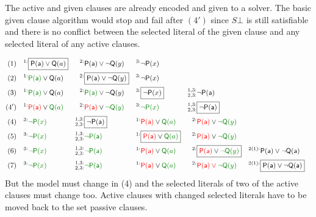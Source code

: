 \begin{example}[InstGen]The active and given clauses are already encoded and given to a \SAT solver.
	The basic given clause algorithm would stop and fail after $(4')$
	since $S\bot$ is still satisfiable and there is no conflict between the selected literal of the given clause 
	and any selected literal of any active clauses.
	
	
	\begin{align*}
	(1)\quad^{1:}&\boxed{\mP(\ma)\lor\mQ(a)} & ^{2:}&\mP(\ma)\lor\lnot\mQ(y) & ^{3:}&\lnot\mP(x)
	\\
	(2)\quad^{1:}&{\colHi\mP(\ma)}\lor\mQ(a) & ^{2:}&\boxed{\mP(\ma)\lor\lnot\mQ(y)} & ^{3:}&\lnot\mP(x) 
	\\
	(3)\quad^{1:}&{\colHi\mP(\ma)}\lor\mQ(a) & ^{2:}&{\colHi\mP(\ma)}\lor\lnot\mQ(y) & ^{3:}&\boxed{\lnot\mP(x)} 
	& ^{1,3:}_{2,3:}&\lnot\mP(\ma)
	\\
	(4')\quad
	^{1:}&{\colLo\mP(\ma)}\lor\colHi\mQ(a) & ^{2:}&{\colLo\mP(\ma)}\lor\colHi\lnot\mQ(y) & ^{3:}&{\colHi\lnot\mP(x)} 
	& ^{1,3:}_{2,3:}&\boxed{\lnot\mP(\ma)}
	\\
	(4)\quad^{3:}&{\colHi\lnot\mP(x)} 
	& ^{1,3:}_{2,3:}&\boxed{\lnot\mP(\ma)}
	& ^{1:}&{\colLo\mP(\ma)}\lor\colHi\mQ(a) & ^{2:}&{\colLo\mP(\ma)}\lor\colHi\lnot\mQ(y)
	\\
	(5)\quad^{3:}&{\colHi\lnot\mP(x)} 
	& ^{1,3:}_{2,3:}&\colHi\lnot\mP(\ma)
	& ^{1:}&\boxed{{\colLo\mP(\ma)}\lor\colHi\mQ(a)} & ^{2:}&{\colLo\mP(\ma)}\lor\colHi\lnot\mQ(y)
	\\
	(6)\quad^{3:}&{\colHi\lnot\mP(x)} 
	& ^{1,3:}_{2,3:}&\colHi\lnot\mP(\ma)
	& ^{1:}&{\colLo\mP(\ma)}\lor\colHi\mQ(a) & ^{2:}&\boxed{{\colLo\mP(\ma)}\lor\colHi\lnot\mQ(y)}
	& ^{2(1):}&\mP(\ma)\lor\lnot\mQ(\ma)
	\\
	(7)\quad^{3:}&{\colHi\lnot\mP(x)} 
	& ^{1,3:}_{2,3:}&\colHi\lnot\mP(\ma)
	& ^{1:}&{\colLo\mP(\ma)}\lor\colHi\mQ(a) & ^{2:}&{\colLo\mP(\ma)\lor\colHi\lnot\mQ(y)}
	& ^{2(1):}&\boxed{\mP(\ma)\lor\lnot\mQ(\ma)}
	\end{align*}
	But the model must change in (4) and the selected literals of two of the active clauses must change too.
	Active clauses with changed selected literals have to be moved back to the set passive clauses.
\end{example}

